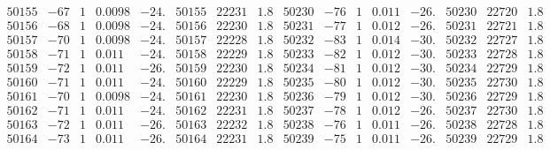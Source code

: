\documentclass[11pt,reqno,a4letter]{article}
\numberwithin{figure}{section}
\numberwithin{table}{section}
\theoremstyle{plain}
\numberwithin{theorem}{section}
\theoremstyle{definition}
\begin{document}
\begin{table}[ht]
\begin{equation*}
{\begin{array}{ccccc|ccc||ccccc|ccc}
50155 & -67 & 1 & 0.0098 & -24. & 50155 & 22231 & 1.8 & 50230 & -76 & 1 & 0.011 & -26. & 50230 & 22720 & 1.8  \\
50156 & -68 & 1 & 0.0098 & -24. & 50156 & 22230 & 1.8 & 50231 & -77 & 1 & 0.012 & -26. & 50231 & 22721 & 1.8  \\
50157 & -70 & 1 & 0.0098 & -24. & 50157 & 22228 & 1.8 & 50232 & -83 & 1 & 0.014 & -30. & 50232 & 22727 & 1.8  \\
50158 & -71 & 1 & 0.011 & -24. & 50158 & 22229 & 1.8 & 50233 & -82 & 1 & 0.012 & -30. & 50233 & 22728 & 1.8  \\
50159 & -72 & 1 & 0.011 & -26. & 50159 & 22230 & 1.8 & 50234 & -81 & 1 & 0.012 & -30. & 50234 & 22729 & 1.8  \\
50160 & -71 & 1 & 0.011 & -24. & 50160 & 22229 & 1.8 & 50235 & -80 & 1 & 0.012 & -30. & 50235 & 22730 & 1.8  \\
50161 & -70 & 1 & 0.0098 & -24. & 50161 & 22230 & 1.8 & 50236 & -79 & 1 & 0.012 & -30. & 50236 & 22729 & 1.8  \\
50162 & -71 & 1 & 0.011 & -24. & 50162 & 22231 & 1.8 & 50237 & -78 & 1 & 0.012 & -26. & 50237 & 22730 & 1.8  \\
50163 & -72 & 1 & 0.011 & -26. & 50163 & 22232 & 1.8 & 50238 & -76 & 1 & 0.011 & -26. & 50238 & 22728 & 1.8  \\
50164 & -73 & 1 & 0.011 & -26. & 50164 & 22231 & 1.8 & 50239 & -75 & 1 & 0.011 & -26. & 50239 & 22729 & 1.8  \\
\end{array}
}
\end{equation*}

\end{table} 

\clearpage 
\end{document}
